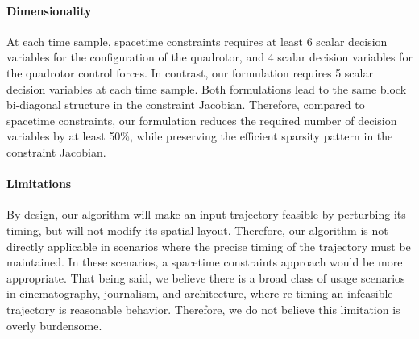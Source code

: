 
\paragraph{Dimensionality}

At each time sample, spacetime constraints requires at least 6 scalar decision variables for the configuration of the quadrotor, and 4 scalar decision variables for the quadrotor control forces.
In contrast, our formulation requires 5 scalar decision variables at each time sample.
Both formulations lead to the same block bi-diagonal structure in the constraint Jacobian.
Therefore, compared to spacetime constraints, our formulation reduces the required number of decision variables by at least 50\%, while preserving the efficient sparsity pattern in the constraint Jacobian.

\paragraph{Limitations}

By design, our algorithm will make an input trajectory feasible by perturbing its timing, but will not modify its spatial layout.
Therefore, our algorithm is not directly applicable in scenarios where the precise timing of the trajectory must be maintained.
In these scenarios, a spacetime constraints approach would be more appropriate.
That being said, we believe there is a broad class of usage scenarios in cinematography, journalism, and architecture, where re-timing an infeasible trajectory is reasonable behavior.
Therefore, we do not believe this limitation is overly burdensome.


